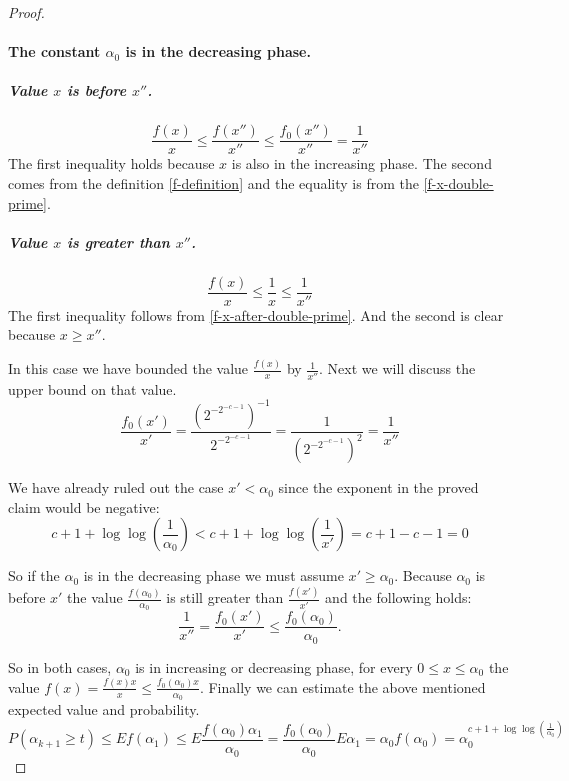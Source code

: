 \begin{proof}
\paragraph*{The constant $\alpha_0$ is in the decreasing phase.}
\subparagraph*{Value $x$ is before $x''$.}
\begin{equation}
\frac{f(x)}{x} \leq \frac{f(x'')}{x''} \leq \frac{f_0(x'')}{x''} = \frac{1}{x''}
\end{equation}
The first inequality holds because $x$ is also in the increasing phase. The second comes from the definition \eqref{f-definition} and the equality is from the \eqref{f-x-double-prime}.

\subparagraph*{Value $x$ is greater than $x''$.}
\begin{equation}
\frac{f(x)}{x} \leq \frac{1}{x} \leq \frac{1}{x''}
\end{equation}
The first inequality follows from \eqref{f-x-after-double-prime}. And the second is clear because $x \geq x''$.

In this case we have bounded the value $\frac{f(x)}{x}$ by $\frac{1}{x''}$. Next we will discuss the upper bound on that value.
\begin{equation}
\frac{f_0(x')}{x'} = \frac{\left({2 ^ {-2 ^ {-c - 1}}}\right)^{-1}}{2 ^ {-2 ^ {-c - 1}}} = \frac{1}{\left({2 ^ {-2 ^ {-c - 1}}}\right)^2} = \frac{1}{x''}
\end{equation}

We have already ruled out the case $x' < \alpha_0$ since the exponent in the proved claim would be negative:
\begin{displaymath}
c + 1 + \log \log \left(\frac{1}{\alpha_0}\right) < c + 1 + \log \log \left(\frac{1}{x'}\right) = c + 1 - c - 1 = 0
\end{displaymath}

So if the $\alpha_0$ is in the decreasing phase we must assume $x' \geq \alpha_0$. Because $\alpha_0$ is before $x'$ the value $\frac{f(\alpha_0)}{\alpha_0}$ is still greater than $\frac{f(x')}{x'}$ and the following holds:
\begin{displaymath}
\frac{1}{x''} = \frac{f_0(x')}{x'} \leq \frac{{f_0}(\alpha_0)}{\alpha_0}\textit{.}
\end{displaymath}

So in both cases, $\alpha_0$ is in increasing or decreasing phase, for every $0 \leq x \leq \alpha_0$ the value $f(x) = \frac{f(x)x}{x} \leq \frac{f_0(\alpha_0)x}{\alpha_0}$. Finally we can estimate the above mentioned expected value and probability.
\begin{displaymath}
P(\alpha_{k+1} \geq t) \leq E f(\alpha_1) \leq E \frac{f(\alpha_0)\alpha_1}{\alpha_0} = \frac{f_0(\alpha_0)}{\alpha_0}E \alpha_1 = \alpha_0 f(\alpha_0) = \alpha_0^{c + 1 + \log \log \left(\frac{1}{\alpha_0}\right)}
\end{displaymath}

\end{proof}

